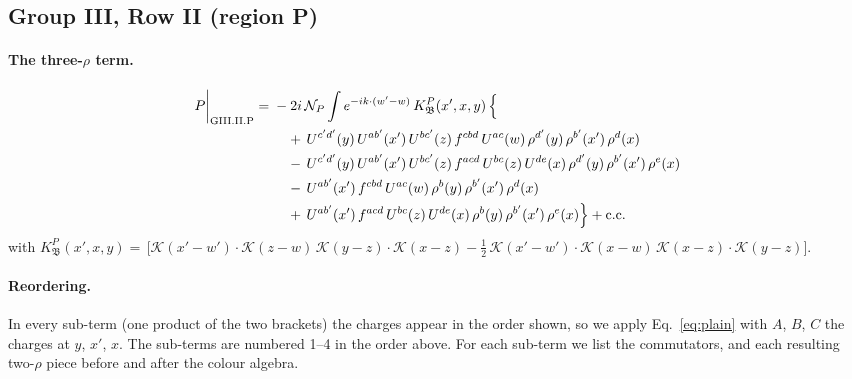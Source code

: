 \documentclass[10pt]{article}
\numberwithin{equation}{section}
\newcommand{\KK}{\mathcal K}
\newcommand{\NP}{\mathcal N_{P}}
\begin{document}
\subsection{Group III, Row II (region P)}\label{sec:GIII.II.P}

\paragraph{The three-$\rho$ term.}
\begin{align}
P\bigg|_{\rm GIII.II.P}={}&-2i\,\NP\int e^{-ik\cdot(w'-w)}\,K^{P}_{\mathfrak B}(x',x,y)\,\Big\{\notag\\
&\quad +\,U^{c'd'}(y)\,U^{ab'}(x')\,U^{bc'}(z)\,f^{cbd}\,U^{ac}(w)\,\rho^{d'}(y)\,\rho^{b'}(x')\,\rho^{d}(x)\notag\\
&\quad -\,U^{c'd'}(y)\,U^{ab'}(x')\,U^{bc'}(z)\,f^{acd}\,U^{bc}(z)\,U^{de}(x)\,\rho^{d'}(y)\,\rho^{b'}(x')\,\rho^{e}(x)\notag\\
&\quad -\,U^{ab'}(x')\,f^{cbd}\,U^{ac}(w)\,\rho^{b}(y)\,\rho^{b'}(x')\,\rho^{d}(x)\notag\\
&\quad +\,U^{ab'}(x')\,f^{acd}\,U^{bc}(z)\,U^{de}(x)\,\rho^{b}(y)\,\rho^{b'}(x')\,\rho^{e}(x)\Big\}+{\rm c.c.}\label{eq:in-GIII.II.P}
\end{align}
with $K^{P}_{\mathfrak B}(x',x,y)=\,\Big[\KK(x'-w')\cdot\KK(z-w)\,\KK(y-z)\cdot\KK(x-z)-\frac{1}{2}\,\KK(x'-w')\cdot\KK(x-w)\,\KK(x-z)\cdot\KK(y-z)\Big]$.
\paragraph{Reordering.} In every sub-term (one product of the two brackets) the charges appear in the order shown, so we apply Eq.~\eqref{eq:plain} with $A$, $B$, $C$ the charges at $y$, $x'$, $x$. The sub-terms are numbered 1--4 in the order above. For each sub-term we list the commutators, and each resulting two-$\rho$ piece before and after the colour algebra.
\end{document}
